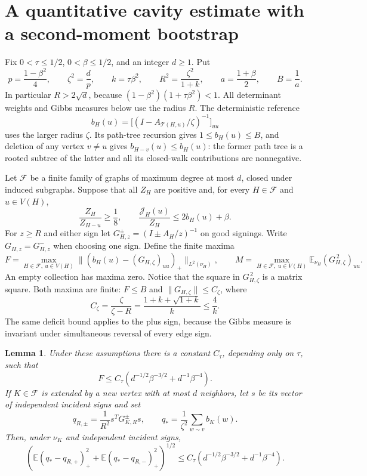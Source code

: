 \documentclass[11pt]{article}
\numberwithin{equation}{section}
\newtheorem{lemma}[theorem]{Lemma}
\begin{document}
\section{A quantitative cavity estimate with a second-moment bootstrap}

Fix $0<\tau\le 1/2$, $0<\beta\le1/2$, and an integer $d\ge1$.
Put
\[
 p=\frac{1-\beta^2}{4},\qquad
 \zeta^2=\frac d p,\qquad
 k=\tau\beta^2,\qquad R^2=\frac{\zeta^2}{1+k},\qquad
 a=\frac{1+\beta}{2},\qquad B=\frac1a.
\]
In particular $R>2\sqrt d$, because
$(1-\beta^2)(1+\tau\beta^2)<1$.
All determinant weights and Gibbs measures below use the radius $R$.
The deterministic reference
\[
 b_H(u)=\bigl[(I-A_{\mathcal T(H,u)}/\zeta)^{-1}\bigr]_{uu}
\]
uses the larger radius $\zeta$. Its path-tree recursion gives
$1\le b_H(u)\le B$, and deletion of any vertex $v\ne u$ gives
$b_{H-v}(u)\le b_H(u)$: the former path tree is a rooted subtree
of the latter and all its closed-walk contributions are nonnegative.

Let $\mathcal F$ be a finite family of graphs of maximum degree at
most $d$, closed under induced subgraphs. Suppose that all $Z_H$ are
positive and, for every $H\in\mathcal F$ and $u\in V(H)$,
\begin{equation}\label{eq:second-order-assumptions}
 \frac{Z_H}{Z_{H-u}}\ge\frac18,
 \qquad
 \frac{\mathcal J_H(u)}{Z_H}\le2b_H(u)+\beta.
\end{equation}
For $z\ge R$ and either sign let
$G_{H,z}^{\pm}=(I\pm A_H/z)^{-1}$ on good signings.
Write $G_{H,z}=G_{H,z}^{-}$ when choosing one sign.
Define the finite maxima
\[
 F=\max_{H\in\mathcal F,\ u\in V(H)}
       \bigl\|(b_H(u)-(G_{H,\zeta})_{uu})_+\bigr\|_{L^2(\nu_H)},
 \qquad
 M=\max_{H\in\mathcal F,\ u\in V(H)}
       \mathbb E_{\nu_H}(G_{H,\zeta}^{\,2})_{uu}.
\]
An empty collection has maxima zero. Notice that the square in
$G_{H,\zeta}^{\,2}$ is a matrix square. Both maxima are finite:
$F\le B$ and $\|G_{H,\zeta}\|\le C_\zeta$, where
\[
 C_\zeta=\frac{\zeta}{\zeta-R}
 =\frac{1+k+\sqrt{1+k}}{k}\le\frac4k.
\]
The same deficit bound applies to the plus sign, because the Gibbs
measure is invariant under simultaneous reversal of every edge sign.

\begin{lemma}\label{lem:second-order-cavity}
Under these assumptions there is a constant $C_\tau$, depending only
on $\tau$, such that
\[
 F\le C_\tau\left(d^{-1/2}\beta^{-3/2}
                         +d^{-1}\beta^{-4}\right).
\]
If $K\in\mathcal F$ is extended by a new vertex with at most $d$
neighbors, let $s$ be its vector of independent incident signs and set
\[
 q_{R,\pm}=\frac1{R^2}s^T G_{K,R}^{\pm}s,
 \qquad q_* =\frac1{\zeta^2}\sum_{w\sim v}b_K(w).
\]
Then, under $\nu_K$ and independent incident signs,
\[
 \left(\mathbb E(q_*-q_{R,+})_+^2
             +\mathbb E(q_*-q_{R,-})_+^2\right)^{1/2}
 \le C_\tau\left(d^{-1/2}\beta^{-3/2}
                         +d^{-1}\beta^{-4}\right).
\]
\end{lemma}
\end{document}
